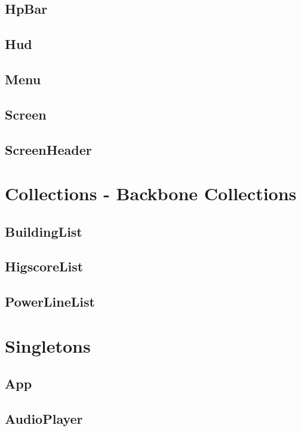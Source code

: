 	\subsection*{HpBar}

	\subsection*{Hud}

	\subsection*{Menu}

	\subsection*{Screen}

	\subsection*{ScreenHeader}

	\clearpage

\section{Collections - Backbone Collections}
	
	\subsection*{BuildingList}

	\subsection*{HigscoreList}

	\subsection*{PowerLineList}

	\clearpage

\section{Singletons}

	\subsection*{App}

	\subsection*{AudioPlayer}

